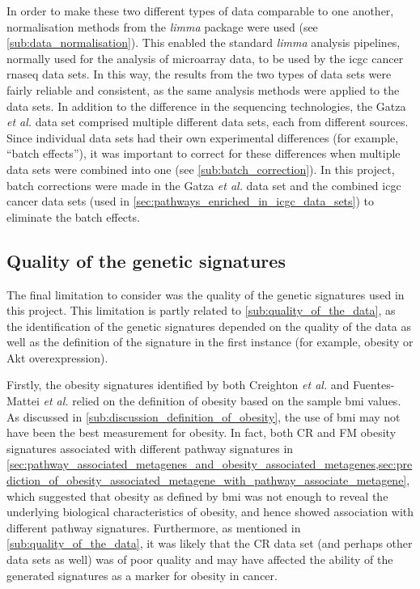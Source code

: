 In order to make these two different types of data comparable to one another, normalisation methods from the \textit{limma} package were used (see \cref{sub:data_normalisation}).
This enabled the standard \textit{limma} analysis pipelines, normally used for the analysis of microarray data, to be used by the \gls{icgc} cancer \gls{rnaseq} data sets.
In this way, the results from the two types of data sets were fairly reliable and consistent, as the same analysis methods were applied to the data sets.
In addition to the difference in the sequencing technologies, the Gatza \textit{et al.} data set comprised multiple different data sets, each from different sources.
Since individual data sets had their own experimental differences (for example, ``batch effects''), it was important to correct for these differences when multiple data sets were combined into one (see \cref{sub:batch_correction}).
In this project, batch corrections were made in the Gatza \textit{et al.} data set and the combined \gls{icgc} cancer data sets (used in \cref{sec:pathways_enriched_in_icgc_data_sets}) to eliminate the batch effects.

\subsection{Quality of the genetic signatures}
\label{sub:quality_of_the_genetic_signatures}

The final limitation to consider was the quality of the genetic signatures used in this project.
This limitation is partly related to \cref{sub:quality_of_the_data}, as  the identification of the  genetic signatures depended  on the quality of the data as well as the definition  of the signature in the first instance (for example,  obesity or Akt overexpression).

Firstly, the obesity signatures identified by both Creighton \textit{et al.} and Fuentes-Mattei \textit{et al.} relied on the definition of obesity based on the sample \gls{bmi} values.
As discussed in \cref{sub:discussion_definition_of_obesity}, the use of \gls{bmi} may not have been the best measurement for obesity.
In fact, both CR and FM obesity signatures associated with different pathway signatures in \cref{sec:pathway_associated_metagenes_and_obesity_associated_metagenes,sec:prediction_of_obesity_associated_metagene_with_pathway_associate_metagene}, which suggested that obesity as defined by \gls{bmi} was not enough to reveal the underlying biological characteristics of obesity, and hence showed association with different pathway signatures.
Furthermore, as mentioned in \cref{sub:quality_of_the_data}, it was likely that the CR data set (and perhaps other data sets as well) was of poor quality and may have affected the ability of the generated signatures as a marker for obesity in cancer.

